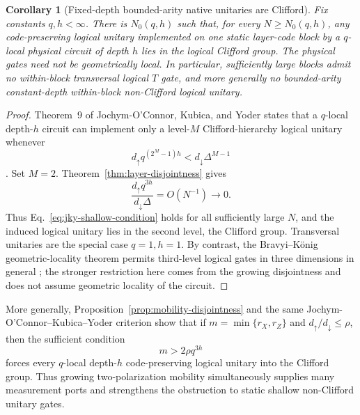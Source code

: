\documentclass[aps,prx,reprint,superscriptaddress,nofootinbib,floatfix,longbibliography]{revtex4-2}
\newtheorem{corollary}[theorem]{Corollary}
\theoremstyle{definition}
\begin{document}
\begin{corollary}[Fixed-depth bounded-arity native unitaries are Clifford]
\label{cor:shallow-clifford-only}
Fix constants $q,h<\infty$.  There is $N_0(q,h)$ such that, for every $N\ge N_0(q,h)$, any code-preserving logical unitary implemented on one static layer-code block by a $q$-local physical circuit of depth $h$ lies in the logical Clifford group.  The physical gates need not be geometrically local.  In particular, sufficiently large blocks admit no within-block transversal logical $T$ gate, and more generally no bounded-arity constant-depth within-block non-Clifford logical unitary.
\end{corollary}
\begin{proof}
Theorem~9 of Jochym-O'Connor, Kubica, and Yoder states that a $q$-local depth-$h$ circuit can implement only a level-$M$ Clifford-hierarchy logical unitary whenever
\begin{equation}
 d_\uparrow q^{(2^M-1)h}<d_\downarrow\Delta^{M-1}
 \label{eq:jky-shallow-condition}
\end{equation}
\cite{JochymDisjointness}.  Set $M=2$.  Theorem~\ref{thm:layer-disjointness} gives
\begin{equation}
 \frac{d_\uparrow q^{3h}}{d_\downarrow\Delta}=O(N^{-1})\longrightarrow0.
\end{equation}
Thus Eq.~\eqref{eq:jky-shallow-condition} holds for all sufficiently large $N$, and the induced logical unitary lies in the second level, the Clifford group.  Transversal unitaries are the special case $q=1,h=1$.  By contrast, the Bravyi--K\"onig geometric-locality theorem permits third-level logical gates in three dimensions in general \cite{BravyiKoenig}; the stronger restriction here comes from the growing disjointness and does not assume geometric locality of the circuit.
\end{proof}

More generally, Proposition~\ref{prop:mobility-disjointness} and the same
Jochym-O'Connor--Kubica--Yoder criterion show that if
$m=\min\{r_X,r_Z\}$ and $d_\uparrow/d_\downarrow\le\rho$, then the sufficient
condition
\begin{equation}
 m>2\rho q^{3h}
 \label{eq:mobility-clifford-sufficient}
\end{equation}
forces every $q$-local depth-$h$ code-preserving logical unitary into the
Clifford group.  Thus growing two-polarization mobility simultaneously
supplies many measurement ports and strengthens the obstruction to static
shallow non-Clifford unitary gates.
\end{document}

